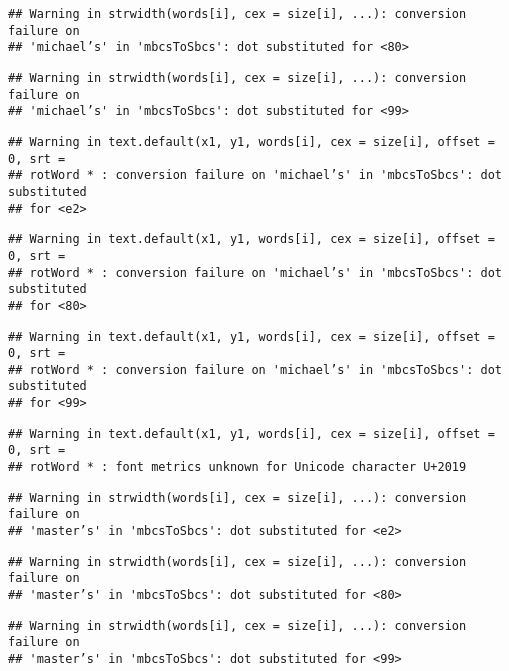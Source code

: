 \documentclass[
]{article}
\begin{document}
\begin{verbatim}
## Warning in strwidth(words[i], cex = size[i], ...): conversion failure on
## 'michael’s' in 'mbcsToSbcs': dot substituted for <80>
\end{verbatim}

\begin{verbatim}
## Warning in strwidth(words[i], cex = size[i], ...): conversion failure on
## 'michael’s' in 'mbcsToSbcs': dot substituted for <99>
\end{verbatim}

\begin{verbatim}
## Warning in text.default(x1, y1, words[i], cex = size[i], offset = 0, srt =
## rotWord * : conversion failure on 'michael’s' in 'mbcsToSbcs': dot substituted
## for <e2>
\end{verbatim}

\begin{verbatim}
## Warning in text.default(x1, y1, words[i], cex = size[i], offset = 0, srt =
## rotWord * : conversion failure on 'michael’s' in 'mbcsToSbcs': dot substituted
## for <80>
\end{verbatim}

\begin{verbatim}
## Warning in text.default(x1, y1, words[i], cex = size[i], offset = 0, srt =
## rotWord * : conversion failure on 'michael’s' in 'mbcsToSbcs': dot substituted
## for <99>
\end{verbatim}

\begin{verbatim}
## Warning in text.default(x1, y1, words[i], cex = size[i], offset = 0, srt =
## rotWord * : font metrics unknown for Unicode character U+2019
\end{verbatim}

\begin{verbatim}
## Warning in strwidth(words[i], cex = size[i], ...): conversion failure on
## 'master’s' in 'mbcsToSbcs': dot substituted for <e2>
\end{verbatim}

\begin{verbatim}
## Warning in strwidth(words[i], cex = size[i], ...): conversion failure on
## 'master’s' in 'mbcsToSbcs': dot substituted for <80>
\end{verbatim}

\begin{verbatim}
## Warning in strwidth(words[i], cex = size[i], ...): conversion failure on
## 'master’s' in 'mbcsToSbcs': dot substituted for <99>
\end{verbatim}
\end{document}
